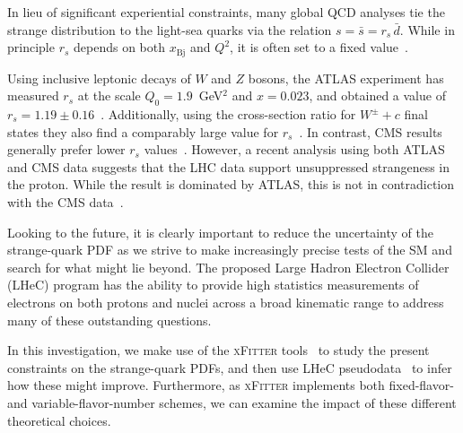 \documentclass[pdftex,twocolumn,epjc3]{svjour3}          %
\newcommand{\xfitter} {\textsc{xFitter}\xspace}
\newcommand{\xbj}{\ensuremath{x_{\text{Bj}}}\xspace}
\begin{document}
In lieu of significant experiential constraints, many global QCD
analyses tie the strange distribution to the light-sea quarks via the
relation $s= \bar{s}=r_s \, \bar{d}$.
%
While in principle $r_s$ depends on both \xbj and $Q^2$, it is often
set to a fixed value~\cite{Kretzer:2003it, Martin:2004ir}.

Using inclusive leptonic decays of $W$ and $Z$ bosons, the ATLAS
experiment has measured $r_s$ at the scale $Q_0 = 1.9$~GeV$^2$ and
$x= 0.023$, and obtained a value of $r_s=1.19 \pm 0.16$~\cite{Aaboud:2016btc}.
%
Additionally, using the cross-section ratio for $W^\pm +c$ final
states they also find a comparably large value for $r_s$~\cite{Aad:2014xca}.
%
In contrast, CMS results generally prefer lower $r_s$
values~\cite{Chatrchyan:2013uja,Sirunyan:2018hde}.  However, a recent analysis using
both ATLAS and CMS data suggests that the LHC data support
unsuppressed strangeness in the proton. While the result is dominated
by ATLAS, this is not in contradiction with the CMS
data~\cite{Cooper-Sarkar:2018ufj,Aaboud:2016btc,Aad:2014xca,Chatrchyan:2013uja}.

Looking to the future, it is clearly important to reduce the
uncertainty of the strange-quark PDF as we strive to make increasingly
precise tests of the SM and search for what might lie beyond.
%
The proposed Large Hadron Electron Collider (LHeC) program has the
ability to provide high statistics measurements of electrons on both
protons and nuclei across a broad kinematic range to address many of
these outstanding questions.

In this investigation, we make use of the \xfitter
tools~\cite{Alekhin:2014irh} to study the present constraints on the
strange-quark PDFs, and then use LHeC pseudodata~\cite{AbelleiraFernandez:2012cc} to infer how these
might improve. Furthermore, as \xfitter implements both fixed-flavor-
and variable-flavor-number schemes, we can examine the impact of these
different theoretical choices.

%  
%  
\end{document}
